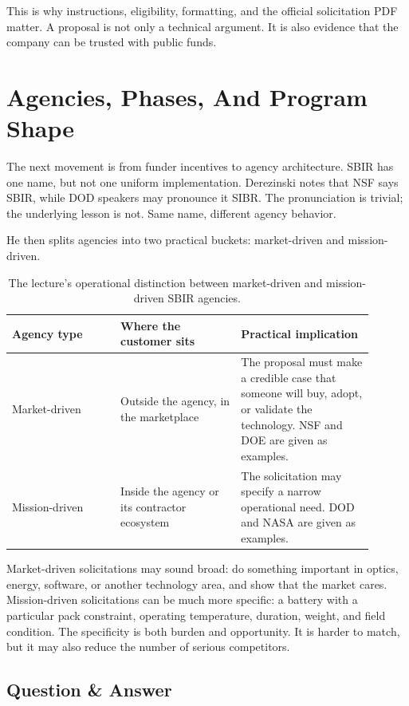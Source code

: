This is why instructions, eligibility, formatting, and the official solicitation PDF matter. A proposal is not only a technical argument. It is also evidence that the company can be trusted with public funds.

\section{Agencies, Phases, And Program Shape}

The next movement is from funder incentives to agency architecture. SBIR has one name, but not one uniform implementation. Derezinski notes that NSF says SBIR, while DOD speakers may pronounce it SIBR. The pronunciation is trivial; the underlying lesson is not. Same name, different agency behavior.

He then splits agencies into two practical buckets: market-driven and mission-driven.

\begin{table}
\centering
\small
\begin{tabular}{p{0.27\linewidth}p{0.30\linewidth}p{0.33\linewidth}}
\hline
Agency type & Where the customer sits & Practical implication\\
\hline
Market-driven & Outside the agency, in the marketplace & The proposal must make a credible case that someone will buy, adopt, or validate the technology. NSF and DOE are given as examples.\\
Mission-driven & Inside the agency or its contractor ecosystem & The solicitation may specify a narrow operational need. DOD and NASA are given as examples.\\
\hline
\end{tabular}
\caption{The lecture's operational distinction between market-driven and mission-driven SBIR agencies.}
\end{table}

Market-driven solicitations may sound broad: do something important in optics, energy, software, or another technology area, and show that the market cares. Mission-driven solicitations can be much more specific: a battery with a particular pack constraint, operating temperature, duration, weight, and field condition. The specificity is both burden and opportunity. It is harder to match, but it may also reduce the number of serious competitors.

\subsection{Question \& Answer}

